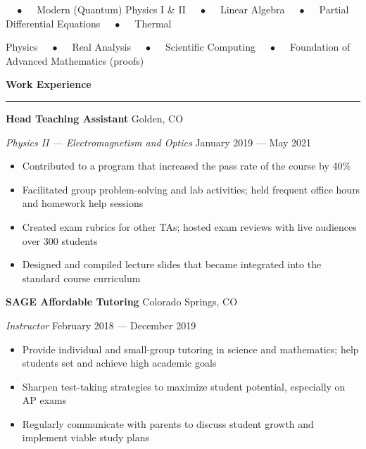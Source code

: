 \documentclass{article}
\numberwithin{equation}{section}
\begin{document}
\hspace{3.0em} $\quad\bullet\quad$ Modern (Quantum) Physics I \& II $\quad\bullet\quad$ Linear Algebra $\quad\bullet\quad$ Partial Differential Equations $\quad\bullet\quad$ Thermal

\hspace{3.0em} Physics $\quad\bullet\quad$ Real Analysis $\quad\bullet\quad$ Scientific Computing $\quad\bullet\quad$ Foundation of Advanced Mathematics (proofs)

\vspace{1em}

\textbf{\Large{Work Experience}} \\[-0.5em]
\rule{\textwidth}{1pt}

\hspace{1.5em} \textbf{Head Teaching Assistant} \hfill Golden, CO

\hspace{1.5em} \textit{Physics II --- Electromagnetism and Optics} \hfill January 2019 --- May 2021

\vspace{-0.5em}

\begin{itemize}[leftmargin=6.0em]
\setlength{\itemsep}{0em}
\item Contributed to a program that increased the pass rate of the course by 40\%
\item Facilitated group problem-solving and lab activities; held frequent office hours and homework help sessions
\item Created exam rubrics for other TAs; hosted exam reviews with live audiences over 300 students
\item Designed and compiled lecture slides that became integrated into the standard course curriculum
\end{itemize}

\hspace{1.5em} \textbf{SAGE Affordable Tutoring} \hfill Colorado Springs, CO

\hspace{1.5em} \textit{Instructor} \hfill February 2018 --- December 2019

\vspace{-0.5em}

\begin{itemize}[leftmargin=6.0em]
\setlength{\itemsep}{0em}
\item Provide individual and small-group tutoring in science and mathematics; help students set and achieve high academic goals
\item Sharpen test-taking strategies to maximize student potential, especially on AP exams
\item Regularly communicate with parents to discuss student growth and implement viable study plans
\end{itemize}
\end{document}
